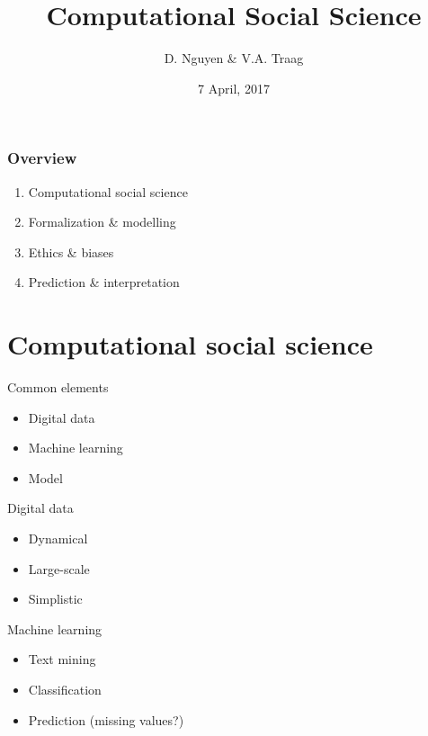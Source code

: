 \documentclass[notes=hide,compress]{beamer}
\title{Computational Social Science}
\author{D. Nguyen \& V.A. Traag}
\institute{
  4TU, Twente, the Netherlands \\[5mm]
  4TU Seminar \\}
\date{7 April, 2017}
\begin{document}
\frame[label=title]{\titlepage}
\begin{frame}[label=overview]
  \frametitle{Overview}
  \begin{enumerate}
    \item Computational social science
    \item Formalization \& modelling
    \item Ethics \& biases
    \item Prediction \& interpretation
  \end{enumerate}
\end{frame}
\section{Computational social science}
\begin{frame}[c]{Common elements}
  \centering
  \parbox{4cm}{
    \begin{itemize}
      \item Digital data
      \item Machine learning
      \item Model
    \end{itemize} 
  }
\end{frame}
\begin{frame}[c]{Digital data}
  \centering
  \parbox{3cm}{
    \begin{itemize}
      \item Dynamical
      \item Large-scale
      \item Simplistic
    \end{itemize}
  }
\end{frame}
\begin{frame}[c]{Machine learning}
  \centering
  \parbox{6cm}{
    \begin{itemize}
      \item Text mining
      \item Classification
      \item Prediction (missing values?)
    \end{itemize}
  }
\end{frame}
\end{document}
